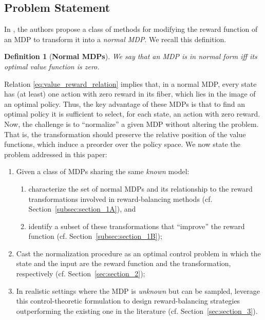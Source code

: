 \documentclass[10pt,leqno]{amsart}
\newtheorem{definition}[theorem]{Definition}
\begin{document}
\subsection{Problem Statement}
In \cite{mustafin2025mdpgeometrynormalizationreward}, the authors propose a class of methods for modifying the reward function of an MDP to transform it into a \emph{normal MDP}. We recall this definition.
\begin{definition}[\textbf{Normal MDPs}]
    We say that an MDP is in normal form iff its optimal value function is zero.
\end{definition} 
\noindent
Relation \eqref{eq:value_reward_relation} implies that, in a normal MDP, every state has (at least) one action with zero reward in its fiber, which lies in the image of an optimal policy. Thus, the key advantage of these MDPs is that to find an optimal policy it is sufficient to select, for each state, an action with zero reward. Now, the challenge is to ``normalize'' a given MDP without altering the problem. That is, the transformation should preserve the relative position of the value functions, which induce a preorder over the policy space. We now state the problem addressed in this paper:
\begin{enumerate}[label=(\alph*)]
    \item Given a class of MDPs sharing the same \emph{known} model:
    \begin{enumerate}[label = $\rhd$]
        \item characterize the set of normal MDPs and its relationship to the reward transformations involved in reward-balancing methods (cf. Section~\ref{subsec:section_1A}), and
        \item identify a subset of these transformations that ``improve'' the reward function (cf. Section~\ref{subsec:section_1B});
    \end{enumerate}  
    \item Cast the normalization procedure as an optimal control problem in which the state and the input are the reward function and the transformation, respectively (cf. Section~\ref{sec:section_2});
    \item In realistic settings where the MDP is \emph{unknown} but can be sampled, leverage this control-theoretic formulation to design reward-balancing strategies outperforming the existing one in the literature (cf. Section~\ref{sec:section_3}).
\end{enumerate}
\end{document}

